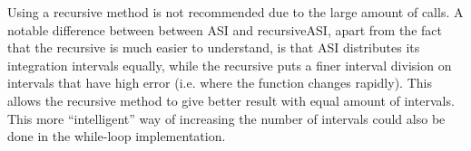 \documentclass[a4paper, 11pt]{report}
\begin{document}
Using a recursive method is not recommended due to the large amount of calls. A notable difference between between ASI and recursiveASI, apart from the fact that the recursive is much easier to understand, is that ASI distributes its integration intervals equally, while the recursive puts a finer interval division on intervals that have high error (i.e. where the function changes rapidly). This allows the recursive method to give better result with equal amount of intervals. This more ``intelligent'' way of increasing the number of intervals could also be done in the while-loop implementation.
\end{document}
